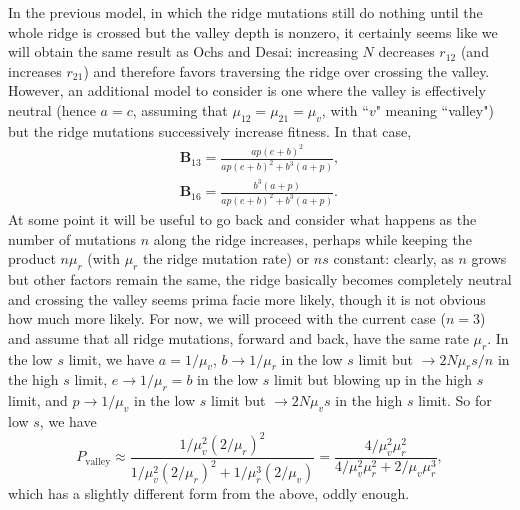 \documentclass[10pt]{revtex4}
\begin{document}
In the previous model, in which the ridge mutations still do nothing until the whole ridge is crossed but the valley depth is nonzero, it certainly seems like we will obtain the same result as Ochs and Desai: increasing $N$ decreases $r_{12}$ (and increases $r_{21}$) and therefore favors traversing the ridge over crossing the valley.
However, an additional model to consider is one where the valley is effectively neutral (hence $a = c$, assuming that $\mu_{12} = \mu_{21} = \mu_v$, with ``$v$" meaning ``valley") but the ridge mutations successively increase fitness.
In that case,
\begin{align}
\textbf{B}_{13} = \frac{ap(e+b)^2}{ap(e+b)^2 + b^3(a+p)}, \\
\textbf{B}_{16} = \frac{b^3(a+p)}{ap(e+b)^2 + b^3(a+p)}.
\end{align}
At some point it will be useful to go back and consider what happens as the number of mutations $n$ along the ridge increases, perhaps while keeping the product $n\mu_r$ (with $\mu_r$ the ridge mutation rate) or $ns$ constant: clearly, as $n$ grows but other factors remain the same, the ridge basically becomes completely neutral and crossing the valley seems prima facie more likely, though it is not obvious how much more likely.
For now, we will proceed with the current case ($n = 3$) and assume that all ridge mutations, forward and back, have the same rate $\mu_r$.
In the low $s$ limit, we have $a = 1/\mu_v$, $b \to 1/\mu_r$ in the low $s$ limit but $\to 2N\mu_r s/n$ in the high $s$ limit, $e \to 1/\mu_r = b$ in the low $s$ limit but blowing up in the high $s$ limit, and $p \to 1/\mu_v$ in the low $s$ limit but $\to 2N\mu_v s$ in the high $s$ limit.
So for low $s$, we have
\begin{equation}
P_{\mathrm{valley}} \approx \frac{1/\mu_v^2(2/\mu_r)^2}{1/\mu_v^2(2/\mu_r)^2 + 1/\mu_r^3(2/\mu_v)} = \frac{4/\mu_v^2\mu_r^2}{4/\mu_v^2\mu_r^2 + 2/\mu_v\mu_r^3},
\end{equation}
which has a slightly different form from the above, oddly enough.
\end{document}
